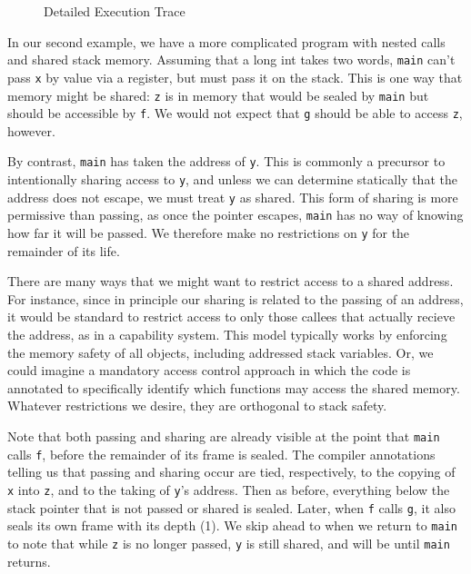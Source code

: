 \begin{figure}
\vspace{\abovedisplayskip}

\caption{Detailed Execution Trace
}
\label{fig:share-trace}
\end{figure}

In our second example, we have a more complicated program with nested calls
and shared stack memory. Assuming that a long int takes two words, {\tt main}
can't pass {\tt x} by value via a register, but must pass it on the stack. This
is one way that memory might be shared: {\tt z} is in memory that would be sealed
by {\tt main} but should be accessible by {\tt f}. We would not expect that {\tt g}
should be able to access {\tt z}, however.

By contrast, {\tt main} has taken the address of {\tt y}. This is commonly a precursor
to intentionally sharing access to {\tt y}, and unless we can determine statically that
the address does not escape, we must treat {\tt y} as shared. This form of sharing is
more permissive than passing, as once the pointer escapes, {\tt main} has no way of knowing
how far it will be passed. We therefore make no restrictions on {\tt y} for the remainder
of its life.

There are many ways that we might want to restrict access to a shared address. For instance,
since in principle our sharing is related to the passing of an address, it would be standard
to restrict access to only those callees that actually recieve the address, as in a capability
system. This model typically works by enforcing the memory safety of all objects, including
addressed stack variables. Or, we could imagine a mandatory access control approach in which
the code is annotated to specifically identify which functions may access the shared memory.
Whatever restrictions we desire, they are orthogonal to stack safety.

Note that both passing and sharing are already visible at the point that {\tt main} calls
{\tt f}, before the remainder of its frame is sealed. The compiler annotations telling
us that passing and sharing occur are tied, respectively, to the copying of {\tt x} into
{\tt z}, and to the taking of {\tt y}'s address. Then as before, everything below the stack
pointer that is not passed or shared is sealed. Later, when {\tt f} calls {\tt g}, it also
seals its own frame with its depth (1). We skip ahead to when we return to {\tt main} to note
that while {\tt z} is no longer passed, {\tt y} is still shared, and will be until {\tt main}
returns.
